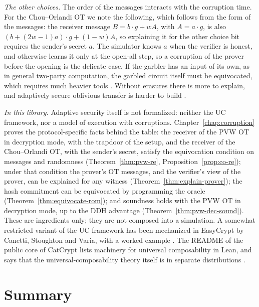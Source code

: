 \emph{The other choices.} The order of the messages interacts with the corruption time. For the
Chou--Orlandi OT we note the following, which follows from the form of the messages: the receiver
message $B = b \cdot g + wA$, with $A = a \cdot g$, is also $(b + (2w - 1) a) \cdot g + (1 - w) A$, so
explaining it for the other choice bit requires the sender's secret $a$. The simulator knows $a$ when
the verifier is honest, and otherwise learns it only at the open-all step, so a corruption of the
prover before the opening is the delicate case. If the garbler has an input of its own, as in general
two-party computation, the garbled circuit itself must be equivocated, which requires much heavier
tools \cite[Sect.~3.2]{GKPS18}. Without erasures there is more to explain, and adaptively secure
oblivious transfer is harder to build \cite{BPRS17}.

\emph{In this library.} Adaptive security itself is not formalized: neither the UC framework, nor
a model of execution with corruptions. Chapter~\ref{chap:corruption} proves the protocol-specific
facts behind the table: the receiver of the PVW OT in decryption mode, with the trapdoor of the
setup, and the receiver of the Chou--Orlandi OT, with the sender's secret, satisfy the
equivocation condition on messages and randomness (Theorem~\ref{thm:pvw-re},
Proposition~\ref{prop:co-re}); under that condition the prover's OT messages, and the verifier's
view of the prover, can be explained for any witness (Theorem~\ref{thm:explain-prover}); the hash commitment can
be equivocated by programming the oracle (Theorem~\ref{thm:equivocate-rom}); and soundness holds
with the PVW OT in decryption mode, up to the DDH advantage (Theorem~\ref{thm:pvw-dec-sound}).
These are ingredients only; they are not composed into a simulation. A somewhat restricted variant of the UC framework has been
mechanized in EasyCrypt by Canetti, Stoughton and Varia, with a worked example \cite{CSV19}. The
README of the public core of CatCrypt lists machinery for universal composability in Lean, and says
that the universal-composability theory itself is in separate distributions \cite{CCcore}.

\section{Summary}

